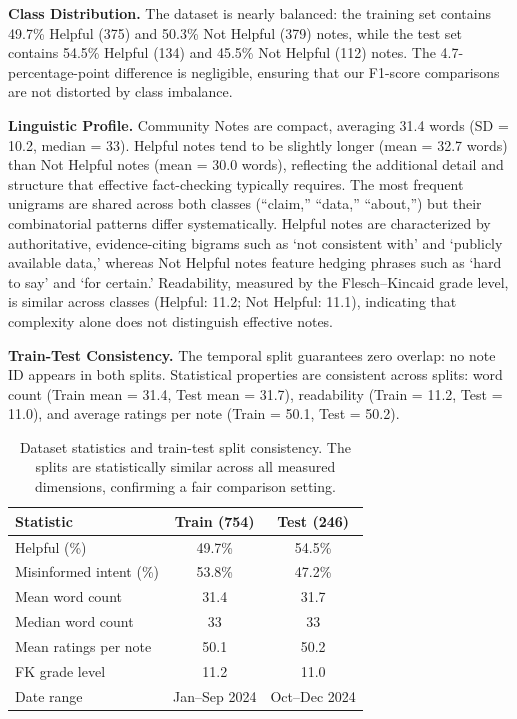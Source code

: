 \documentclass[11pt]{article}
\begin{document}
	\noindent\textbf{Class Distribution.} The dataset is nearly balanced: the training set contains 49.7\% Helpful (375) and 50.3\% Not Helpful (379) notes, while the test set contains 54.5\% Helpful (134) and 45.5\% Not Helpful (112) notes. The 4.7-percentage-point difference is negligible, ensuring that our F1-score comparisons are not distorted by class imbalance.
	
	\noindent\textbf{Linguistic Profile.} Community Notes are compact, averaging 31.4 words (SD = 10.2, median = 33). Helpful notes tend to be slightly longer (mean = 32.7 words) than Not Helpful notes (mean = 30.0 words), reflecting the additional detail and structure that effective fact-checking typically requires. The most frequent unigrams are shared across both classes (``claim,'' ``data,'' ``about,'') but their combinatorial patterns differ systematically. Helpful notes are characterized by authoritative, evidence-citing bigrams such as `not consistent with' and `publicly available data,' whereas Not Helpful notes feature hedging phrases such as `hard to say' and `for certain.' Readability, measured by the Flesch--Kincaid grade level, is similar across classes (Helpful: 11.2; Not Helpful: 11.1), indicating that complexity alone does not distinguish effective notes.
	
	\noindent\textbf{Train-Test Consistency.} The temporal split guarantees zero overlap: no note ID appears in both splits. Statistical properties are consistent across splits: word count (Train mean = 31.4, Test mean = 31.7), readability (Train = 11.2, Test = 11.0), and average ratings per note (Train = 50.1, Test = 50.2).
	
	\begin{table}[t]
		\centering
		\small
		\setlength{\tabcolsep}{4pt}
		\begin{tabular}{lcc}
			\toprule
			\textbf{Statistic} & \textbf{Train (754)} & \textbf{Test (246)} \\
			\midrule
			Helpful (\%) & 49.7\% & 54.5\% \\
			Misinformed intent (\%) & 53.8\% & 47.2\% \\
			Mean word count & 31.4 & 31.7 \\
			Median word count & 33 & 33 \\
			Mean ratings per note & 50.1 & 50.2 \\
			FK grade level & 11.2 & 11.0 \\
			Date range & Jan--Sep 2024 & Oct--Dec 2024 \\
			\bottomrule
		\end{tabular}
		\caption{Dataset statistics and train-test split consistency. The splits are statistically similar across all measured dimensions, confirming a fair comparison setting.}
		\label{tab:dataset-stats}
	\end{table}
	
\end{document}
